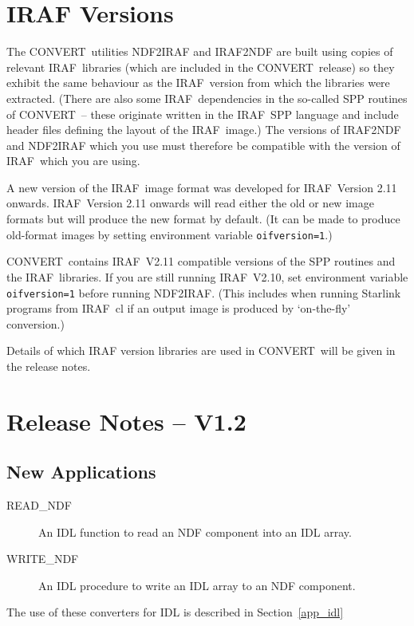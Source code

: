 \documentclass[twoside,11pt]{article}
\newcommand{\htmladdnormallink}[2]{#1}
\newcommand{\htmlref}[2]{#1}
\newcommand{\latexelsehtml}[2]{#1}
\newcommand{\latexelsehtml}[2]{#2}
\newcommand{\CONVERT}{{\footnotesize CONVERT}}
\newcommand{\IRAF}{{\footnotesize IRAF}}
\newcommand{\IRAFURL}{http://star-www.rl.ac.uk/iraf/web/iraf-homepage.html}
\newcommand{\IRAFref}{\htmladdnormallink{\IRAF}{\IRAFURL}}
\newcommand{\IDLURL}{http://www.rsinc.com/idl/}
\newcommand{\IDLref}{\htmladdnormallink{IDL}{\IDLURL}}
\begin{document}
\newpage

\section[{\small IRAF} Versions]{\label{iraf_versions}{\normalsize IRAF} Versions}
The \CONVERT\ utilities 
\htmlref{NDF2IRAF}{NDF2IRAF}
and
\htmlref{IRAF2NDF}{IRAF2NDF}
are built using copies of relevant \IRAF\ libraries (which are included in
the \CONVERT\ release) so they exhibit the same behaviour as the \IRAF\ version
from which the libraries were extracted.
(There are also some \IRAF\ dependencies in the so-called SPP 
routines of \CONVERT\ -- these originate written in the \IRAF\ SPP language and 
include header files defining the layout of the \IRAF\ image.)
The versions of IRAF2NDF and NDF2IRAF which you use must therefore be
compatible with the version of \IRAF\ which you are using.

A new version of the \IRAFref\ image format was developed for 
\IRAF\ Version 2.11 onwards.
\IRAF\ Version 2.11 onwards will read either the old or new image formats but
will  produce the new format by default. (It can be made to produce old-format
images by setting environment variable \texttt{oifversion=1}.)

\CONVERT\ contains \IRAF\ V2.11 compatible versions of the SPP 
routines and the \IRAF\ libraries.
If you are still running \IRAF\ V2.10, set environment variable 
\texttt{oifversion=1} before running NDF2IRAF. (This includes when running 
Starlink programs from \IRAF\ cl if an output image is produced by 
`on-the-fly' conversion.)

Details of which IRAF version libraries are used in \CONVERT\ will be given in
the release notes.

\section{Release Notes -- V1.2}
\subsection{New Applications}
\begin{description}
\item[\htmlref{READ\_NDF}{READ_NDF}] An IDL function to read an NDF component
into an IDL array.
\item[\htmlref{WRITE\_NDF}{WRITE_NDF}] An IDL procedure to write an IDL array to
an NDF component.
\end{description}
The use of these converters for IDL is described in
\latexelsehtml{Section~\ref{app_idl}}{\htmlref{Handling NDFs in \IDLref}{app_idl}}
\end{document}
